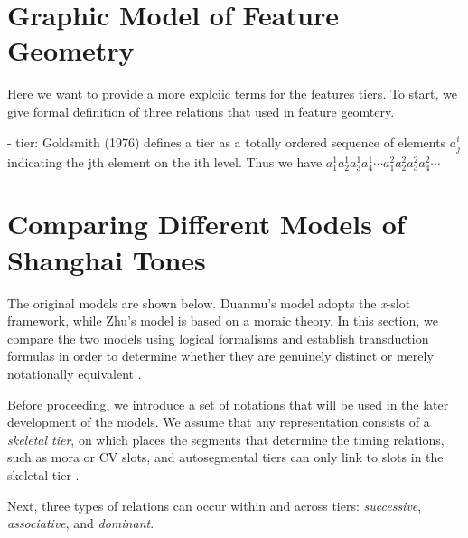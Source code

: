 \documentclass[11pt]{article}
\begin{document}
\section{Graphic Model of Feature Geometry}

Here we want to provide a more explciic terms for the features tiers. To start, we give formal definition of three
relations that used in feature geomtery.

- tier: Goldsmith (1976) defines a tier as a totally ordered  sequence of elements $a^i_j$ indicating the jth element on the ith level. Thus we have
\(
a^1_1a^1_2a^1_3a^1_4 \cdots
a^2_1a^2_2a^2_3a^2_4 \cdots
\)


\section{Comparing Different Models of Shanghai Tones}
The original models are shown below. Duanmu’s model adopts the \textit{x}-slot framework, 
while Zhu’s model is based on a moraic theory. In this section, we compare the two 
models using logical formalisms and establish transduction formulas in order to 
determine whether they are genuinely distinct or merely notationally equivalent 
\citep{strother2019diss,oakdenNotationalEquivalenceTonal2020}.

Before proceeding, we introduce a set of notations that will be used in the later 
development of the models. We assume that any representation consists of a 
\emph{skeletal tier}, on which places the segments that determine the timing 
relations, such as mora or CV slots, and autosegmental tiers can only link 
to slots in the skeletal tier \citep{pulleyblank1983diss}.

Next, three types of relations can occur within and across tiers: \textit{successive},
\textit{associative}, and \textit{dominant}.
\end{document}
